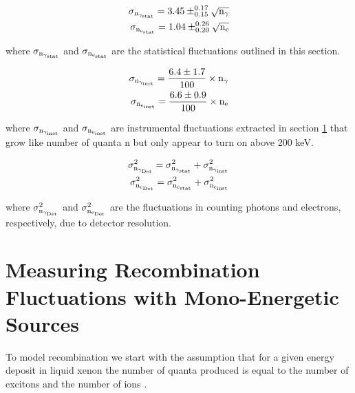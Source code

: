 \begin{equation}
\begin{split}
\rm  \sigma_{n_{\gamma_{stat}}} = 3.45\pm_{0.15}^{0.17} \sqrt{n_\gamma}\\
\rm \sigma_{n_{e_{stat}}} = 1.04\pm_{0.20}^{0.26} \sqrt{n_e}
\label{eq:SigStat}
\end{split}
\end{equation}

\noindent where  $\rm \sigma_{n_{\gamma_{stat}}}$ and $\rm \sigma_{n_{e_{stat}}}$ are the statistical fluctuations outlined in this section.

\begin{equation}
\begin{split}
\rm  \sigma_{n_{\gamma_{inst}}} = \frac{6.4\pm 1.7}{100} \times n_\gamma\\
\rm  \sigma_{n_{e_{inst}}} = \frac{6.6\pm 0.9}{100} \times n_e
\label{eq:SigInst}
\end{split}
\end{equation}

\noindent where  $\rm \sigma_{n_{\gamma_{inst}}}$ and $\rm \sigma_{n_{e_{inst}}}$ are instrumental fluctuations extracted in section \ref{sec:flucs_mono} that grow like number of quanta n but only appear to turn on above 200 keV.

\begin{equation}
\begin{split}
\rm  \sigma_{n_{\gamma_{Det}}}^2 = \sigma_{n_{\gamma_{stat}}}^2 + \sigma_{n_{\gamma_{inst}}}^2 \\
\rm \sigma_{n_{e_{Det}}}^2 = \sigma_{n_{e_{stat}}}^2 + \sigma_{n_{e_{inst}}}^2
\label{eq:SigDet}
\end{split}
\end{equation}

\noindent where  $\rm \sigma_{n_{\gamma_{Det}}}^2$ and $\rm \sigma_{n_{e_{Det}}}^2$ are the fluctuations in counting photons and electrons, respectively, due to detector resolution.


\section{Measuring Recombination Fluctuations with Mono-Energetic Sources}
\label{sec:flucs_mono}

To model recombination we start with the assumption that for a given energy deposit in liquid xenon the number of quanta produced is equal to the number of excitons and the number of ions \cite{Platzman}. 

